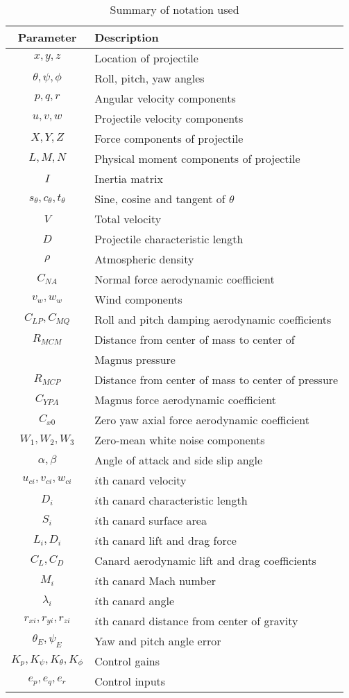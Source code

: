 \documentclass[letterpaper, 10 pt, conference]{ieeeconf}  %
\begin{document}
\begin{table}[!h]
\vspace{3mm}
	\caption{\label{tab:parameters}Summary of notation used}
	\centering
	\begin{tabular}{cl} 
		\hline
		Parameter &Description\\
		\hline
$x, y, z$& Location of projectile\\
$\theta, \psi, \phi$& Roll, pitch, yaw angles\\
$p, q, r$ &Angular velocity components\\
$u, v, w$& Projectile velocity components\\
$X, Y, Z$& Force components of projectile\\
$L, M, N$& Physical moment components of projectile\\
$I$& Inertia matrix\\
$s_\theta, c_\theta, t_\theta$& Sine, cosine and tangent of $\theta$\\
$V$& Total velocity\\
$D$&Projectile characteristic length\\
$\rho$ &Atmospheric density\\
$C_{NA}$& Normal force aerodynamic coefficient\\
$v_w, w_w$& Wind components\\
$C_{LP}, C_{MQ}$& Roll and pitch damping aerodynamic coefficients\\
$R_{MCM}$& Distance from center of mass to center of\\
&  Magnus pressure\\
$R_{MCP}$&Distance from center of mass to center of pressure\\
$C_{YPA}$& Magnus force aerodynamic coefficient\\
$C_{x0}$& Zero yaw axial force aerodynamic coefficient\\
$W_1, W_2, W_3$& Zero-mean white noise components\\
$\alpha, \beta$& Angle of attack and side slip angle \\
$u_{ci}, v_{ci}, w_{ci}$& $i$th canard velocity \\
$D_i$& $i$th canard characteristic length \\
$S_i$& $i$th canard surface area \\
$L_i, D_i$& $i$th canard lift and drag force \\
$C_L, C_D$& Canard aerodynamic lift and drag coefficients\\
$M_i$& $i$th canard Mach number \\
$\lambda_i$& $i$th canard angle \\
$r_{xi}, r_{yi}, r_{zi}$& $i$th canard distance from center of gravity \\
$\theta_E, \psi_E$& Yaw and pitch angle error \\
$K_p, K_{\psi}, K_{\theta}, K_{\phi}$& Control gains \\
$e_p, e_q, e_r$& Control inputs \\
		\hline
	\end{tabular}
\end{table} 
\end{document}
